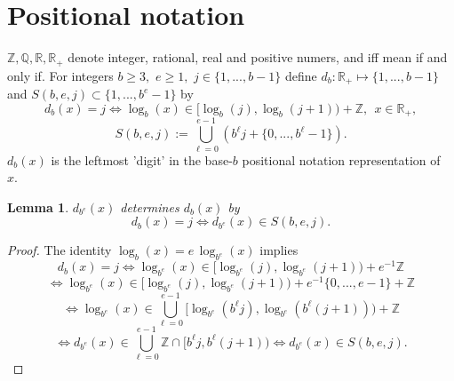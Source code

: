 \documentclass[14pt, twoside, a4paper]{article} %
\newtheorem{lem}{Lemma}                                                    %
\newtheorem{proof}{Proof}                                              %
\begin{document}
\section{Positional notation}\label{sec1}
%
$\mathbb Z, \mathbb Q, \mathbb R, \mathbb R_+$ denote integer, rational, real and positive numers, and iff mean if and only if. For integers $b \geq 3,$ $e \geq 1,$ 
$j \in \{1,...,b-1\}$ define 
$d_b : \mathbb R_+ \mapsto \{1,...,b-1\}$ and 
$S(b,e,j) \subset \{1,...,b^e - 1 \}$ by
%
\begin{equation}\label{eq1}
	d_b(x) = j \iff \log_b(x) \in [\log_b(j), \log_b(j+1)) + \mathbb Z, \ \ x \in \mathbb R_+,
\end{equation}
%
\begin{equation}\label{eq2}
	S(b,e,j) := 
\bigcup_{\ell = 0}^{e-1} 
\left( b^\ell j +\{0,...,b^\ell - 1\} \right).
\end{equation}
%
$d_b(x)$ is the leftmost 'digit' in the base-$b$ positional notation representation of $x.$
%
\begin{lem}\label{lem1}
$d_{b^e}(x)$ determines $d_b(x)$ by
%
\begin{equation}\label{eq3}
 d_b(x) = j \iff d_{b^e}(x) \in S(b,e,j).
\end{equation}
%
\end{lem}
\begin{proof}
The identity $\log_b(x) = e\, \log_{b^e}(x)$ implies
%
$$d_b(x) = j \iff  \log_{b^e}(x) \in [\log_{b^e}(j),\log_{b^e}(j+1)) + e^{-1}\mathbb Z$$
%
$$\iff \log_{b^e}(x) \in [\log_{b^e}(j),\log_{b^e}(j+1))+ e^{-1}\{0,...,e-1\} + \mathbb Z$$
%
$$\iff  \log_{b^e}(x) \in \bigcup_{\ell = 0}^{e-1} 
[\log_{b^e}(b^\ell j),\log_{b^e}(b^\ell (j+1))) + \mathbb Z$$
%
$$\iff  d_{b^e}(x) \in \bigcup_{\ell = 0}^{e-1} 
\mathbb Z \cap [b^\ell j,b^\ell (j+1)) \iff  d_{b^e}(x) \in S(b,e,j).$$
\end{proof}
%
\end{document}
